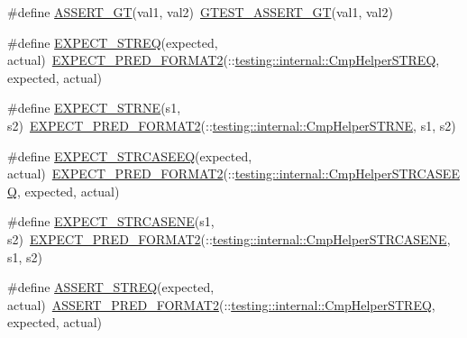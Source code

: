 \begin{DoxyCompactItemize}
\item 
\#define \hyperlink{fused-src_2gtest_2gtest_8h_a16a882d4eafc9f8643867aea40879140}{\-A\-S\-S\-E\-R\-T\-\_\-\-G\-T}(val1, val2)~\hyperlink{include_2gtest_2gtest_8h_a088b9056fd1c1f316b41c22f64deb33a}{\-G\-T\-E\-S\-T\-\_\-\-A\-S\-S\-E\-R\-T\-\_\-\-G\-T}(val1, val2)
\item 
\#define \hyperlink{fused-src_2gtest_2gtest_8h_a5b4b193a92c39b99d7b9404c49feef0b}{\-E\-X\-P\-E\-C\-T\-\_\-\-S\-T\-R\-E\-Q}(expected, actual)~\hyperlink{gtest__pred__impl_8h_af0141918615a5e2d5247e9cda8324dae}{\-E\-X\-P\-E\-C\-T\-\_\-\-P\-R\-E\-D\-\_\-\-F\-O\-R\-M\-A\-T2}(\-::\hyperlink{namespacetesting_1_1internal_aac3ea8412a9d5f786b992a2b06aeb353}{testing\-::internal\-::\-Cmp\-Helper\-S\-T\-R\-E\-Q}, expected, actual)
\item 
\#define \hyperlink{fused-src_2gtest_2gtest_8h_aee7e9c42f55549dbc0dfc42391eb9775}{\-E\-X\-P\-E\-C\-T\-\_\-\-S\-T\-R\-N\-E}(s1, s2)~\hyperlink{gtest__pred__impl_8h_af0141918615a5e2d5247e9cda8324dae}{\-E\-X\-P\-E\-C\-T\-\_\-\-P\-R\-E\-D\-\_\-\-F\-O\-R\-M\-A\-T2}(\-::\hyperlink{namespacetesting_1_1internal_a24dfe04b51cda2637868440f0e6a7110}{testing\-::internal\-::\-Cmp\-Helper\-S\-T\-R\-N\-E}, s1, s2)
\item 
\#define \hyperlink{fused-src_2gtest_2gtest_8h_acd0cb7ae81a768e9cc639804a478e71c}{\-E\-X\-P\-E\-C\-T\-\_\-\-S\-T\-R\-C\-A\-S\-E\-E\-Q}(expected, actual)~\hyperlink{gtest__pred__impl_8h_af0141918615a5e2d5247e9cda8324dae}{\-E\-X\-P\-E\-C\-T\-\_\-\-P\-R\-E\-D\-\_\-\-F\-O\-R\-M\-A\-T2}(\-::\hyperlink{namespacetesting_1_1internal_aa5c3543f39545113a66c5b4d8f829fc6}{testing\-::internal\-::\-Cmp\-Helper\-S\-T\-R\-C\-A\-S\-E\-E\-Q}, expected, actual)
\item 
\#define \hyperlink{fused-src_2gtest_2gtest_8h_a07d0b5cbd3b5f7c8b6f44c609046ff07}{\-E\-X\-P\-E\-C\-T\-\_\-\-S\-T\-R\-C\-A\-S\-E\-N\-E}(s1, s2)~\hyperlink{gtest__pred__impl_8h_af0141918615a5e2d5247e9cda8324dae}{\-E\-X\-P\-E\-C\-T\-\_\-\-P\-R\-E\-D\-\_\-\-F\-O\-R\-M\-A\-T2}(\-::\hyperlink{namespacetesting_1_1internal_a87ee06a47690ee4681d40e1bf6a4a3c5}{testing\-::internal\-::\-Cmp\-Helper\-S\-T\-R\-C\-A\-S\-E\-N\-E}, s1, s2)
\item 
\#define \hyperlink{fused-src_2gtest_2gtest_8h_a54e8edaad096ff704fedaa65a3e24f78}{\-A\-S\-S\-E\-R\-T\-\_\-\-S\-T\-R\-E\-Q}(expected, actual)~\hyperlink{gtest__pred__impl_8h_ac452685a1a98ea3d96eb956a062ee210}{\-A\-S\-S\-E\-R\-T\-\_\-\-P\-R\-E\-D\-\_\-\-F\-O\-R\-M\-A\-T2}(\-::\hyperlink{namespacetesting_1_1internal_aac3ea8412a9d5f786b992a2b06aeb353}{testing\-::internal\-::\-Cmp\-Helper\-S\-T\-R\-E\-Q}, expected, actual)

\end{DoxyCompactItemize}
